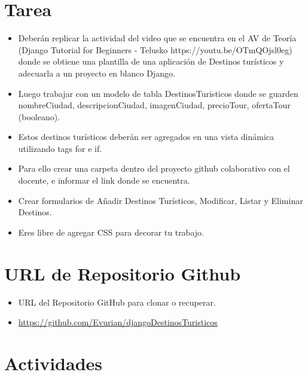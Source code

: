 \documentclass{article}
\begin{document}
	\section{Tarea}
	\begin{itemize}		
		\item Deberán replicar la actividad del video que se encuentra en el AV de Teoría (Django Tutorial for Beginners - Telusko https://youtu.be/OTmQOjsl0eg) donde se obtiene una plantilla de una aplicación de Destinos turísticos y adecuarla a un proyecto en blanco Django.
		\item Luego trabajar con un modelo de tabla DestinosTuristicos donde se guarden nombreCiudad,  descripcionCiudad, imagenCiudad, precioTour, ofertaTour (booleano).  
		\item Estos destinos turísticos deberán ser agregados en una vista dinámica utilizando tags for e if.
		\item Para ello crear una carpeta dentro del proyecto github colaborativo con el docente, e informar el link donde se encuentra.
		\item Crear formularios de Añadir Destinos Turísticos, Modificar, Listar y Eliminar Destinos.  
		\item Eres libre de agregar CSS para decorar tu trabajo.
		
	\end{itemize}
	
	\section{URL de Repositorio Github}
	\begin{itemize}
		\item URL del Repositorio GitHub para clonar o recuperar.
		\item \url{https://github.com/Evurian/djangoDestinosTuristicos}

	\end{itemize}
	
	\section{Actividades}
\end{document}
